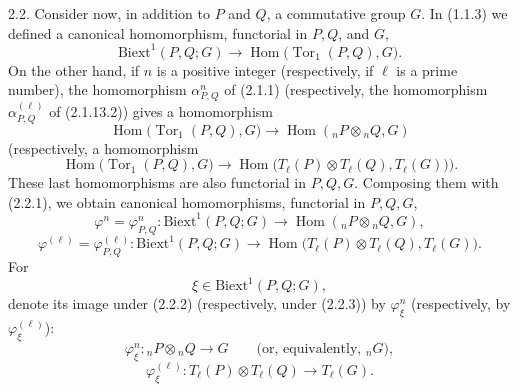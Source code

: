 
2.2. Consider now, in addition to $P$ and $Q$, a commutative group
$G$.  In (1.1.3) we defined a canonical homomorphism, functorial in
$P,Q$, and $G$,
\begin{equation}\tag{2.2.1}
 \mathrm{Biext}^1(P,Q;G)
 \longrightarrow
 \operatorname{Hom}\bigl(\operatorname{Tor}_1(P,Q),G\bigr).
\end{equation}
On the other hand, if $n$ is a positive integer (respectively, if
$\ell$ is a prime number), the homomorphism $\alpha^n_{P,Q}$ of
(2.1.1) (respectively, the homomorphism $\alpha^{(\ell)}_{P,Q}$ of
(2.1.13.2)) gives a homomorphism
\[
 \operatorname{Hom}\bigl(\operatorname{Tor}_1(P,Q),G\bigr)
 \longrightarrow
 \operatorname{Hom}({}_nP\otimes{}_nQ,G)
\]
(respectively, a homomorphism
\[
 \operatorname{Hom}\bigl(\operatorname{Tor}_1(P,Q),G\bigr)
 \longrightarrow
 \operatorname{Hom}\bigl(
   T_\ell(P)\otimes T_\ell(Q),T_\ell(G)
 \bigr)).
\]
These last homomorphisms are also functorial in $P,Q,G$.
Composing them with (2.2.1), we obtain canonical homomorphisms,
functorial in $P,Q,G$,
\begin{equation}\tag{2.2.2}
 \varphi^n=\varphi^n_{P,Q}:
 \mathrm{Biext}^1(P,Q;G)
 \longrightarrow
 \operatorname{Hom}({}_nP\otimes{}_nQ,G),
\end{equation}
\begin{equation}\tag{2.2.3}
 \varphi^{(\ell)}=\varphi^{(\ell)}_{P,Q}:
 \mathrm{Biext}^1(P,Q;G)
 \longrightarrow
 \operatorname{Hom}\bigl(
   T_\ell(P)\otimes T_\ell(Q),T_\ell(G)
 \bigr).
\end{equation}
For
\begin{equation}\tag{2.2.4}
 \xi\in\mathrm{Biext}^1(P,Q;G),
\end{equation}
denote its image under (2.2.2) (respectively, under (2.2.3)) by
$\varphi^n_\xi$ (respectively, by $\varphi^{(\ell)}_\xi$):
\begin{equation}\tag{2.2.5}
 \varphi^n_\xi:{}_nP\otimes{}_nQ
 \longrightarrow G
 \qquad\text{(or, equivalently, }{}_nG\text{)},
\end{equation}
\begin{equation}\tag{2.2.6}
 \varphi^{(\ell)}_\xi:
 T_\ell(P)\otimes T_\ell(Q)
 \longrightarrow T_\ell(G).
\end{equation}

